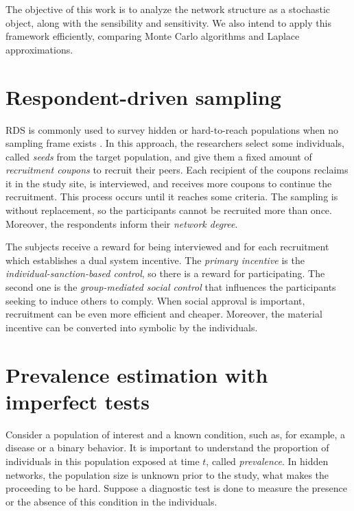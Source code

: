 The objective of this work is to analyze the network structure as a stochastic object, along with the sensibility and sensitivity. We also intend to apply this framework efficiently, comparing Monte Carlo algorithms and Laplace approximations.

\section{Respondent-driven sampling}

RDS is commonly used to survey hidden or hard-to-reach populations when
no sampling frame exists \cite{heckathorn1997}. In this approach, the
researchers select some individuals, called {\em seeds} from the target
population, and give them a fixed amount of {\em recruitment coupons} to
recruit their peers. Each recipient of the coupons reclaims it in the study
site, is interviewed, and receives more coupons to continue the recruitment.
This process occurs until it reaches some criteria. The sampling is without
replacement, so the participants cannot be recruited more than once. Moreover,
the respondents inform their {\em network degree}.

The subjects receive a reward for being interviewed and for each recruitment
which establishes a dual system incentive. The {\em primary incentive} is the
{\em individual-sanction-based control}, so there is a reward for
participating. The second one is the {\em group-mediated social control} that
influences the participants seeking to induce others to comply. When social
approval is important, recruitment can be even more efficient and cheaper.
Moreover, the material incentive can be converted into symbolic by the
individuals. 




\section{Prevalence estimation with imperfect tests}

Consider a population of interest and a known condition, such as, for example,
a disease or a binary behavior. It is important to understand the proportion
of individuals in this population exposed at time $t$, called {\em
prevalence}. In hidden networks, the population size is unknown prior to the
study, what makes the proceeding to be hard. Suppose a diagnostic test is done to measure the presence or the
absence of this condition in the individuals. 

